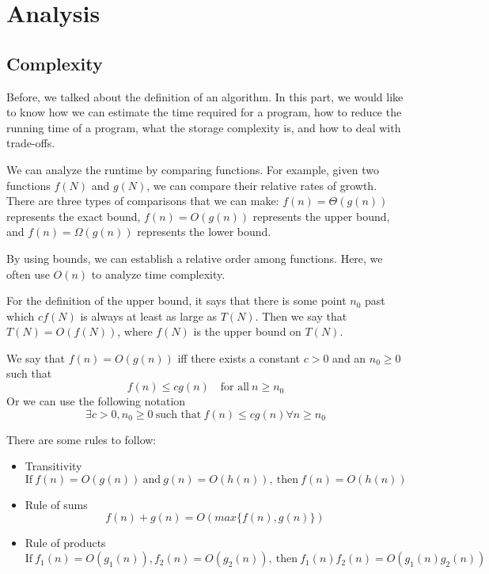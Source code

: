 \chapter{Analysis}

\section{Complexity}
Before, we talked about the definition of an algorithm. In this part, we would like to know how we can estimate the time required for a program, how to reduce the running time of a program, what the storage complexity is, and how to deal with trade-offs.

We can analyze the runtime by comparing functions. For example, given two functions \(f(N)\) and \(g(N)\), we can compare their relative rates of growth. There are three types of comparisons that we can make: \(f(n) = \Theta(g(n))\) represents the exact bound, \(f(n) = O(g(n))\) represents the upper bound, and \(f(n) = \Omega(g(n))\) represents the lower bound.

By using bounds, we can establish a relative order among functions. Here, we often use \(O(n)\) to analyze time complexity. 

For the definition of the upper bound, it says that there is some point \(n_0\) past which \(c f(N)\) is always at least as large as \(T(N)\). Then we say that \(T(N) = O(f(N))\), where \(f(N)\) is the upper bound on \(T(N)\).

\begin{definition}
  We say that \(f(n) = O(g(n))\) iff there exists a constant \(c > 0\) and an \(n_0 \geq 0\) such that
  \[
  f(n) \leq cg(n)\quad\text{for all}\ n \geq n_0
  \]
  Or we can use the following notation
  \[
      \exists c > 0, n_0 \geq 0\ \text{such that}\ f(n) \leq cg(n) \forall n \geq n_0
  \]
\end{definition}

There are some rules to follow:

\begin{itemize}
  \item Transitivity
      \[
          \text{If}\ f(n) = O(g(n))\ \text{and}\ g(n) = O(h(n)),\ \text{then}\ f(n) = O(h(n))
      \]
  \item Rule of sums
      \[
          f(n) + g(n) = O(max\{f(n), g(n)\})
      \]
  \item Rule of products
      \[
          \text{If}\ f_1(n) = O(g_1(n)), f_2(n) = O(g_2(n)),\ \text{then}\ f_1(n)f_2(n) = O(g_1(n)g_2(n))
      \]
\end{itemize}

